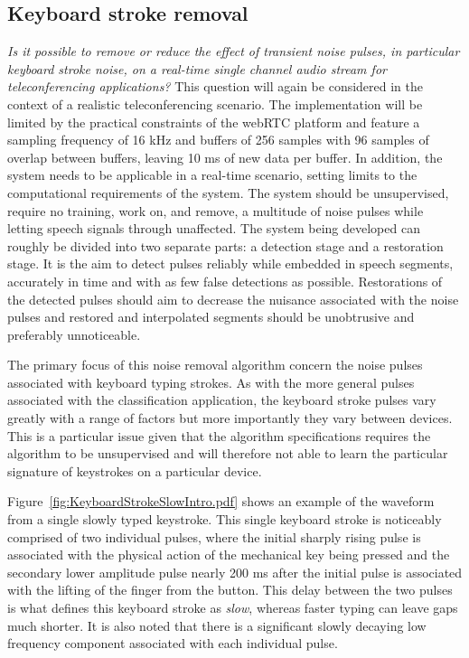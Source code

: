 \subsection{Keyboard stroke removal}
\emph{Is it possible to remove or reduce the effect of transient noise pulses, in particular keyboard stroke noise, on a real-time single channel audio stream for teleconferencing applications?}
This question will again be considered in the context of a realistic teleconferencing scenario. The implementation will be limited by the practical constraints of the webRTC platform and feature a sampling frequency of 16 kHz and buffers of 256 samples with 96 samples of overlap between buffers, leaving 10 ms of new data per buffer. In addition, the system needs to be applicable in a real-time scenario, setting limits to the computational requirements of the system. The system should be unsupervised, require no training, work on, and remove, a multitude of noise pulses while letting speech signals through unaffected. The system being developed can roughly be divided into two separate parts: a detection stage and a restoration stage. It is the aim to detect pulses reliably while embedded in speech segments, accurately in time and with as few false detections as possible. Restorations of the detected pulses should aim to decrease the nuisance associated with the noise pulses and restored and interpolated segments should be unobtrusive and preferably unnoticeable.

The primary focus of this noise removal algorithm concern the noise pulses associated with keyboard typing strokes. As with the more general pulses associated with the classification application, the keyboard stroke pulses vary greatly with a range of factors but more importantly they vary between devices. This is a particular issue given that the algorithm specifications requires the algorithm to be unsupervised and will therefore not able to learn the particular signature of keystrokes on a particular device.

Figure~\ref{fig:KeyboardStrokeSlowIntro.pdf} shows an example of the waveform from a single slowly typed keystroke. This single keyboard stroke is noticeably comprised of two individual pulses, where the initial sharply rising pulse is associated with the physical action of the mechanical key being pressed and the secondary lower amplitude pulse nearly 200 ms after the initial pulse is associated with the lifting of the finger from the button. This delay between the two pulses is what defines this keyboard stroke as \emph{slow}, whereas faster typing can leave gaps much shorter. It is also noted that there is a significant slowly decaying low frequency component associated with each individual pulse.

